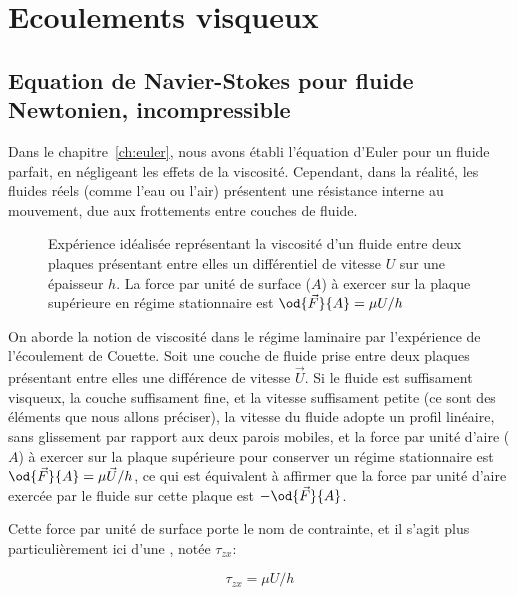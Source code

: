 \chapter{Ecoulements visqueux}
\label{ch:newtonien}

\section{Equation de Navier-Stokes pour fluide Newtonien, incompressible}

Dans le chapitre~\ref{ch:euler}, nous avons établi l'équation d'Euler pour un fluide parfait, en négligeant les effets de la viscosité. Cependant, dans la réalité, les fluides réels (comme l'eau ou l'air) présentent une résistance interne au mouvement, due aux frottements entre couches de fluide. 


\begin{figure}
  \begin{center}
    
  \end{center}
  \caption{Expérience idéalisée représentant la viscosité d'un fluide entre deux plaques présentant entre elles un différentiel de vitesse  $U$ sur une épaisseur $h$. La force par unité de surface ($A$) à exercer sur la plaque supérieure en régime stationnaire est $\od{\vec{F}}{A}= \mu U/h$}\label{fig:couette}
\end{figure}

On aborde la notion de viscosité dans le régime laminaire par l'expérience de l'écoulement de Couette. Soit une couche de fluide prise entre deux plaques présentant entre elles une différence de vitesse $\vec{U}$. Si le fluide est suffisament visqueux, la couche suffisament fine, et la vitesse suffisament petite (ce sont des éléments que nous allons préciser), la vitesse du fluide adopte un profil linéaire, sans glissement par rapport aux deux parois mobiles, et la force par unité d'aire ($A$) à exercer sur la plaque supérieure pour conserver un régime stationnaire  est $\od{\vec{F}}{A}=\mu \vec{U}/h$, ce qui est équivalent à affirmer que la force par unité d'aire exercée par le fluide sur cette plaque est $-\od{\vec{F}}{A}$. 

Cette force par unité de surface porte le nom de contrainte, et il s'agit plus particulièrement ici d'une , notée $\tau_{zx}$:


\begin{displaymath}
  \tau_{zx} = \mu U/h
\end{displaymath}

